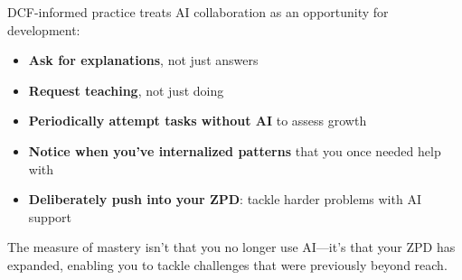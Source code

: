 DCF-informed practice treats AI collaboration as an opportunity for development:

\begin{itemize}
    \item \textbf{Ask for explanations}, not just answers
    \item \textbf{Request teaching}, not just doing
    \item \textbf{Periodically attempt tasks without AI} to assess growth
    \item \textbf{Notice when you've internalized patterns} that you once needed help with
    \item \textbf{Deliberately push into your ZPD}: tackle harder problems with AI support
\end{itemize}

The measure of mastery isn't that you no longer use AI---it's that your ZPD has expanded, enabling you to tackle challenges that were previously beyond reach.
